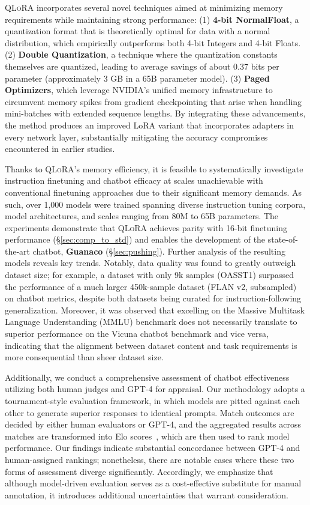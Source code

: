 \textsc{QLoRA} incorporates several novel techniques aimed at minimizing memory requirements while maintaining strong performance: (1) \textbf{4-bit NormalFloat}, a quantization format that is theoretically optimal for data with a normal distribution, which empirically outperforms both 4-bit Integers and 4-bit Floats. (2) \textbf{Double Quantization}, a technique where the quantization constants themselves are quantized, leading to average savings of about 0.37 bits per parameter (approximately 3 GB in a 65B parameter model). (3) \textbf{Paged Optimizers}, which leverage NVIDIA’s unified memory infrastructure to circumvent memory spikes from gradient checkpointing that arise when handling mini-batches with extended sequence lengths. By integrating these advancements, the method produces an improved LoRA variant that incorporates adapters in every network layer, substantially mitigating the accuracy compromises encountered in earlier studies.

Thanks to \textsc{QLoRA}’s memory efficiency, it is feasible to systematically investigate instruction finetuning and chatbot efficacy at scales unachievable with conventional finetuning approaches due to their significant memory demands. As such, over 1,000 models were trained spanning diverse instruction tuning corpora, model architectures, and scales ranging from 80M to 65B parameters. The experiments demonstrate that \textsc{QLoRA} achieves parity with 16-bit finetuning performance (\S\ref{sec:comp_to_std}) and enables the development of the state-of-the-art chatbot, \textbf{Guanaco} (\S\ref{sec:pushing}). Further analysis of the resulting models reveals key trends. Notably, data quality was found to greatly outweigh dataset size; for example, a dataset with only 9k samples (OASST1) surpassed the performance of a much larger 450k-sample dataset (FLAN v2, subsampled) on chatbot metrics, despite both datasets being curated for instruction-following generalization. Moreover, it was observed that excelling on the Massive Multitask Language Understanding (MMLU) benchmark does not necessarily translate to superior performance on the Vicuna chatbot benchmark and vice versa, indicating that the alignment between dataset content and task requirements is more consequential than sheer dataset size.

Additionally, we conduct a comprehensive assessment of chatbot effectiveness utilizing both human judges and GPT-4 for appraisal. Our methodology adopts a tournament-style evaluation framework, in which models are pitted against each other to generate superior responses to identical prompts. Match outcomes are decided by either human evaluators or GPT-4, and the aggregated results across matches are transformed into Elo scores~\citep{elo1967proposed, elo1978rating}, which are then used to rank model performance. Our findings indicate substantial concordance between GPT-4 and human-assigned rankings; nonetheless, there are notable cases where these two forms of assessment diverge significantly. Accordingly, we emphasize that although model-driven evaluation serves as a cost-effective substitute for manual annotation, it introduces additional uncertainties that warrant consideration.

